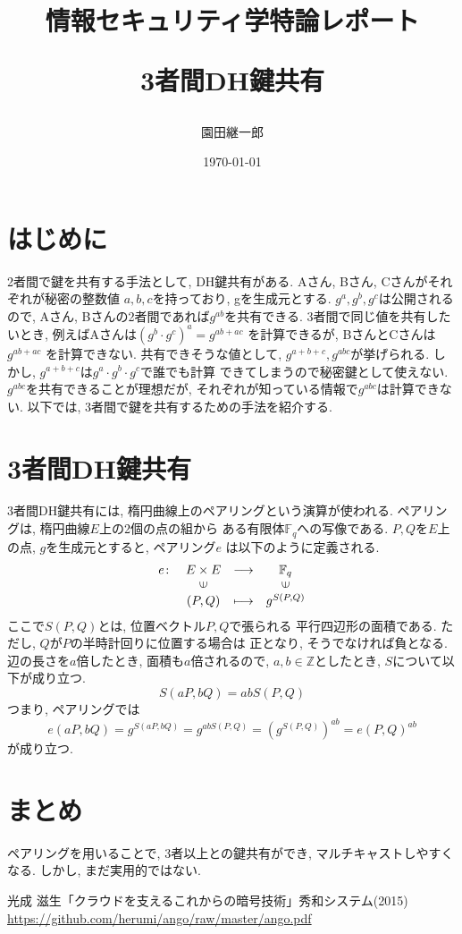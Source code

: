 \documentclass[a4paper,11pt]{jsarticle}
\begin{document}
\title{情報セキュリティ学特論レポート

3者間DH鍵共有}
\author{園田継一郎}
\date{\today}
\maketitle

\section{はじめに}
2者間で鍵を共有する手法として, DH鍵共有がある.
Aさん, Bさん, Cさんがそれぞれが秘密の整数値
$a, b, c$を持っており, gを生成元とする.
$g^a, g^b, g^c$は公開されるので, 
Aさん, Bさんの2者間であれば$g^{ab}$を共有できる.
3者間で同じ値を共有したいとき,
例えばAさんは$(g^b \cdot g^c)^a = g^{ab + ac}$
を計算できるが, BさんとCさんは$g^{ab + ac}$
を計算できない.
共有できそうな値として, $g^{a + b + c}, g^{abc}$が挙げられる.
しかし, $g^{a + b + c}$は$g^a \cdot g^b \cdot g^c$で誰でも計算
できてしまうので秘密鍵として使えない.
$g^{abc}$を共有できることが理想だが, 
それぞれが知っている情報で$g^{abc}$は計算できない.
以下では, 3者間で鍵を共有するための手法を紹介する.

\section{3者間DH鍵共有}
3者間DH鍵共有には, 楕円曲線上のペアリングという演算が使われる.
ペアリングは, 楕円曲線$E$上の2個の点の組から
ある有限体$\mathbb{F}_q$への写像である\cite{bib1}.
$P, Q$を$E$上の点, $g$を生成元とすると, ペアリング$e$
は以下のように定義される.
\[
  \begin{array}{rccc}
    e \colon & E \times E & \longrightarrow & \mathbb{F}_q \\
            & \rotatebox{90}{$\in$} & & \rotatebox{90}{$\in$} \\
            & (P, Q) & \longmapsto & g^{S(P, Q)}
  \end{array}
\]
ここで$S(P, Q)$とは, 位置ベクトル$P, Q$で張られる
平行四辺形の面積である. ただし, $Q$が$P$の半時計回りに位置する場合は
正となり, そうでなければ負となる. 辺の長さを$a$倍したとき, 
面積も$a$倍されるので, $a, b \in \mathbb{Z}$としたとき, 
$S$について以下が成り立つ. 
\[
  S(aP, bQ) = abS(P, Q)
\]
つまり, ペアリングでは
\[
  e(aP, bQ) = g^{S(aP, bQ)} = g^{abS(P, Q)} =
  \left(g^{S(P, Q)}\right)^{ab} = e(P, Q)^{ab}
\]
が成り立つ.

\section{まとめ}
ペアリングを用いることで, 3者以上との鍵共有ができ,
マルチキャストしやすくなる.
しかし, まだ実用的ではない.

\begin{thebibliography}{99}
  光成 滋生「クラウドを支えるこれからの暗号技術」秀和システム(2015) \url{https://github.com/herumi/ango/raw/master/ango.pdf}
\end{thebibliography}
\end{document}
